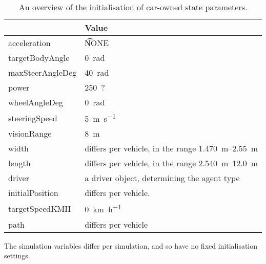 \begin{table}
	\centering
	\begin{tabularx}{\textwidth}{>{\ttfamily}lX}
		\toprule
		\normalfont{Parameter}	& Value \\  
		\midrule
		acceleration 			
			& \t{NONE} \\ 
		targetBodyAngle 		
			& \SI[mode=text]{0}{\radian} \\ 
		maxSteerAngleDeg 		
			& \SI[mode=text]{40}{\radian} \\ 
		power 					
			& \SI[mode=text]{250}{?}\\ 
		wheelAngleDeg 			
			& \SI[mode=text]{0}{\radian} \\ 
		steeringSpeed 			
			& \SI[mode=text]{5}{\meter\per\second} \\ 
		visionRange 			
			& \SI[mode=text]{8}{\meter} \\ 
		width 					
			& differs per vehicle, in the range \SIrange{1.470}{2.55}{\meter} \\ 
		length 					
			& differs per vehicle, in the range \SIrange{2.540}{12.0}{\meter} \\ 
		driver 					
			& a driver object, determining the agent type \\
		initialPosition 		
			& differs per vehicle. \\ 
		targetSpeedKMH			
			& \SI[mode=text]{0}{\kilo\meter\per\hour} \\ 
		path					
			& differs per vehicle \\ 
		\bottomrule
	\end{tabularx}
	\caption{An overview of the initialisation of car-owned state parameters.}
	\label{tab:par:method:model:details:init:car:value}
\end{table} 

The simulation variables differ per simulation, and so have no fixed initialisation settings.


